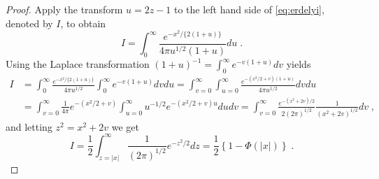 \documentclass[ECP]{ejpecp} %
\newcommand{\half}{\frac{1}{2}}
\begin{document}
\begin{proof}
  Apply the transform $u = 2z-1$ to the left hand side of \eqref{eq:erdelyi}, denoted by $I$, to obtain 
  \[
  I = \int_{0}^{\infty} \frac{e^{-x^2/\{2(1+u)\}}}{4 \pi {u}^{1/2} (1+u)} du \;.
  \]
  Using the Laplace transformation $(1+u)^{-1} = \int_0^{\infty} e^{-v(1+u)} dv$ yields
  \begin{align*}
    I &= \int_{0}^{\infty} \frac{e^{-x^2/\{2(1+u)\}}}{4 \pi {u}^{1/2}} 
    \int_0^{\infty} e^{-v(1+u)} dv du 
    = \int_{v= 0}^{\infty} \int_{u=0}^{\infty} 
    \frac{e^{-({x^2}/{2} + v)(1+u)}}{4 \pi {u}^{1/2}} dv du
    \\
    &= \int_{v= 0}^{\infty} \frac{1}{4\pi} e^{-({x^2}/{2} + v)} 
    \int_{u=0}^{\infty} u^{-1/2} e^{-({x^2}/{2} + v) u} du dv 
    = \int_{v= 0}^{\infty} \frac{e^{-(x^2 + 2v)/2}}{2 (2\pi)^{1/2}} 
    \frac{1}{(x^2+ 2v)^{1/2} } dv
    \;,
  \end{align*}
  and letting $z^2 = x^2 + 2v$ we get 
  \begin{equation*}
    I = \half \int_{z = |x|}^{\infty} \frac{1}{(2\pi)^{1/2}} e^{-z^2/2} dz 
    = \half \left\{1 - \Phi(|x|)\right\} \;.
  \end{equation*} 
\end{proof}


\end{document}
